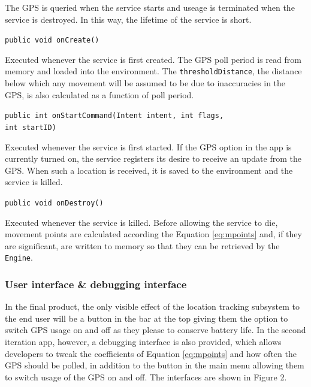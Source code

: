 \documentclass[12pt,a4paper,twoside]{article}
\begin{document}
The GPS is queried when the service starts and useage is terminated when the service is destroyed. In this way, the lifetime of the service is short.

\verb=public void onCreate()=
\begin{myindentpar}{1cm}
Executed whenever the service is first created. The GPS poll period is read from memory and loaded into the environment. The \verb=thresholdDistance=, the distance below which any movement will be assumed to be due to inaccuracies in the GPS, is also calculated as a function of poll period.
\end{myindentpar}

\verb=public int onStartCommand(Intent intent, int flags,=\newline
\verb=                          int startID)=
\begin{myindentpar}{1cm}
Executed whenever the service is first started. If the GPS option in the app is currently turned on, the service registers its desire to receive an update from the GPS. When such a location is received, it is saved to the environment and the service is killed.
\end{myindentpar}

\verb=public void onDestroy()=
\begin{myindentpar}{1cm}
Executed whenever the service is killed. Before allowing the service to die, movement points are calculated according the Equation \ref{eq:mpoints} and, if they are significant, are written to memory so that they can be retrieved by the \verb=Engine=.
\end{myindentpar}

\subsubsection{User interface \& debugging interface}
In the final product, the only visible effect of the location tracking subsystem to the end user will be a button in the bar at the top giving them the option to switch GPS usage on and off as they please to conserve battery life. In the second iteration app, however, a debugging interface is also provided, which allows developers to tweak the coefficients of Equation \ref{eq:mpoints} and how often the GPS should be polled, in addition to the button in the main menu allowing them to switch usage of the GPS on and off. The interfaces are shown in Figure 2.
\end{document}
